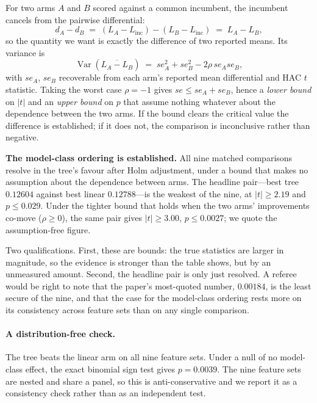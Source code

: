 For two arms $A$ and $B$ scored against a common incumbent, the incumbent
cancels from the pairwise differential:
\begin{equation}
  d_A - d_B \;=\; (L_A - L_{\text{inc}}) - (L_B - L_{\text{inc}}) \;=\; L_A - L_B ,
  \label{eq:pairwise_cancel}
\end{equation}
so the quantity we want is exactly the difference of two reported means. Its
variance is
\begin{equation}
  \operatorname{Var}\!\left(\overline{L_A - L_B}\right)
  \;=\; se_A^2 + se_B^2 - 2\rho\, se_A se_B ,
  \label{eq:pairwise_var}
\end{equation}
with $se_A$, $se_B$ recoverable from each arm's reported mean differential and
HAC $t$ statistic. Taking the worst case $\rho = -1$ gives
$se \le se_A + se_B$, hence a \emph{lower bound} on $|t|$ and an \emph{upper
bound} on $p$ that assume nothing whatever about the dependence between the two
arms. If the bound clears the critical value the difference is established; if
it does not, the comparison is inconclusive rather than negative.



\textbf{The model-class ordering is established.} All nine matched comparisons
resolve in the tree's favour after Holm adjustment, under a bound that makes no
assumption about the dependence between arms. The headline pair---best tree
$0.12604$ against best linear $0.12788$---is the weakest of the nine, at
$|t| \ge 2.19$ and $p \le 0.029$. Under the tighter bound that holds when the
two arms' improvements co-move ($\rho \ge 0$), the same pair gives
$|t| \ge 3.00$, $p \le 0.0027$; we quote the assumption-free figure.

Two qualifications. First, these are bounds: the true statistics are larger in
magnitude, so the evidence is stronger than the table shows, but by an
unmeasured amount. Second, the headline pair is only just resolved. A referee
would be right to note that the paper's most-quoted number, $0.00184$, is the
least secure of the nine, and that the case for the model-class ordering rests
more on its consistency across feature sets than on any single comparison.

\paragraph{A distribution-free check.} The tree beats the linear arm on all
nine feature sets. Under a null of no model-class effect, the exact binomial
sign test gives $p = 0.0039$. The nine feature sets are nested and share a
panel, so this is anti-conservative and we report it as a consistency check
rather than as an independent test.

